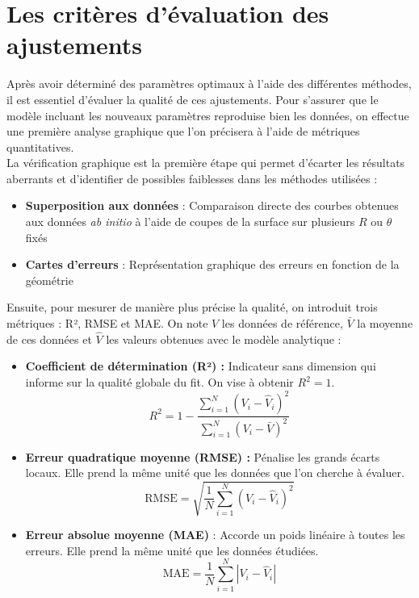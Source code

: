 \documentclass[11pt, a4paper, openany]{report}
\begin{document}
\section{Les critères d'évaluation des ajustements}

\noindent Après avoir déterminé des paramètres optimaux à l'aide des différentes
méthodes, il est essentiel d'évaluer la qualité de ces ajustements. Pour s'assurer 
que le modèle incluant les nouveaux paramètres reproduise bien les données, on
effectue une première analyse graphique que l'on précisera à l'aide de métriques 
quantitatives.\\

\noindent La vérification graphique est la première étape qui permet d'écarter
les résultats aberrants et d'identifier de possibles faiblesses dans les méthodes
utilisées :
\begin{itemize}
  \item \textbf{Superposition aux données} : Comparaison directe des courbes
    obtenues aux données \textit{ab initio} à l'aide de coupes de la surface sur 
    plusieurs $R$ ou $\theta$ fixés
  \item \textbf{Cartes d'erreurs} : Représentation graphique des erreurs en 
    fonction de la géométrie
  \end{itemize}

\qquad

\noindent Ensuite, pour mesurer de manière plus précise la qualité, on introduit 
trois métriques : R², RMSE et MAE. On note $V$ les données de référence, $\bar{V}$ la moyenne de ces données et 
$\hat{V}$ les valeurs obtenues avec le modèle analytique :

\begin{itemize}
  \item \textbf{Coefficient de détermination (R²) :} Indicateur sans dimension 
    qui informe sur la qualité globale du fit. On vise à obtenir $R^2=1$.
    $$R^2 = 1 - \frac{ \sum\limits_{i=1}^{N} (V_i - \hat{V}_i)^2 }{ \sum\limits_{i=1}^{N} (V_i - \bar{V})^2 }$$
  \item \textbf{Erreur quadratique moyenne (RMSE) :} Pénalise
    les grands écarts locaux. Elle prend la même unité que les données que
    l'on cherche à évaluer.
    $$\text{RMSE} = \sqrt{ \frac{1}{N} \sum_{i=1}^{N} \left( V_i - \hat{V}_i \right)^2 }$$
  \item \textbf{Erreur absolue moyenne (MAE)} : Accorde un poids linéaire à toutes 
    les erreurs. Elle prend la même unité que les données étudiées.
    $$\text{MAE} = \frac{1}{N} \sum_{i=1}^{N} \left\vert{} V_i - \hat{V}_i \right\vert{}$$
\end{itemize}
\end{document}
